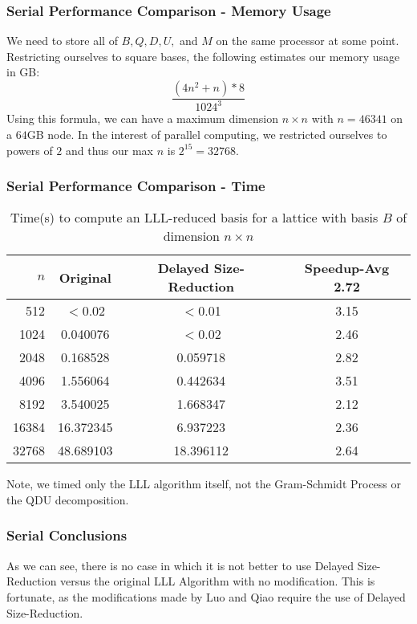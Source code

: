 \documentclass{beamer}
\begin{document}
\begin{frame}
\frametitle{Serial Performance Comparison - Memory Usage}
We need to store all of $B,Q,D,U,$ and $M$ on the same processor at some point. Restricting ourselves to square bases, the following estimates our memory usage in GB:
$$\frac{(4n^2+n)*8}{1024^3}$$
Using this formula, we can have a maximum dimension $n \times n$ with $n=46341$ on a $64$GB node. In the interest of parallel computing, we restricted ourselves to powers of $2$ and thus our max $n$ is $2^{15}=32768$.
\end{frame}
\begin{frame}
\frametitle{Serial Performance Comparison - Time}
\begin{table} \centering
  \caption{Time(s) to compute an LLL-reduced basis for a lattice with basis $B$ of dimension $n\times n$}
  \label{tab:convdemo}
  \vspace{-0.5\baselineskip}
  \begin{tabular}{rccc}
    \hline
    $n$ & Original & Delayed Size-Reduction & Speedup-Avg 2.72\\
    \hline
      512 & $<$0.02   & $<$0.01   & 3.15 \\
     1024 & 0.040076  & $<$0.02   & 2.46 \\
     2048 & 0.168528  & 0.059718  & 2.82 \\
     4096 & 1.556064  & 0.442634  & 3.51 \\
     8192 & 3.540025  & 1.668347  & 2.12 \\
    16384 & 16.372345 & 6.937223  & 2.36 \\
    32768 & 48.689103 & 18.396112 & 2.64 \\
    \hline                          
  \end{tabular}
\end{table}
\tiny{Note, we timed only the LLL algorithm itself, not the Gram-Schmidt Process or the QDU decomposition.}
\end{frame}

\begin{frame}
\frametitle{Serial Conclusions}
As we can see, there is no case in which it is not better to use Delayed Size-Reduction versus the original LLL Algorithm with no modification.
This is fortunate, as the modifications made by Luo and Qiao require the use of Delayed Size-Reduction.
\end{frame}
\end{document}
